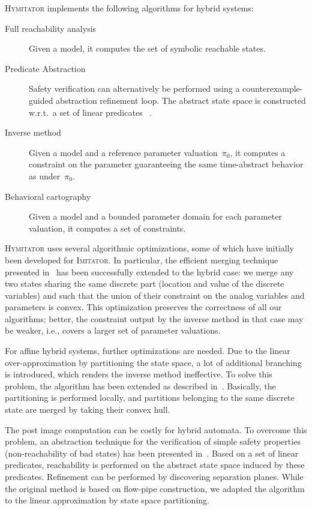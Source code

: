 \documentclass{llncs}
\newcommand{\pio}{\pi_0}
\newcommand{\imitator}{\textsc{Imitator}}
\newcommand{\hymitator}{\textsc{Hymitator}}
\begin{document}
\hymitator{} implements the following algorithms for hybrid systems:
\begin{description}
	\item[Full reachability analysis] Given a model, it computes the set of symbolic reachable states.
\item[Predicate Abstraction] Safety verification can alternatively be performed using a counterexample-guided abstraction refinement loop. The abstract state space is constructed w.r.t.~a set of linear predicates%
	~\cite{ADI2006}.
	\item[Inverse method] Given a model and a reference parameter valuation~$\pio$, it computes a constraint on the parameter guaranteeing the same time-abstract behavior as under~$\pio$.
	\item[Behavioral cartography] Given a model and a bounded parameter domain for each parameter valuation, it computes a set of constraints.%
\end{description}

\hymitator{} uses several algorithmic optimizations, some of which have initially been developed for \imitator{}.
In particular, the efficient merging technique presented in~\cite{AFS12} has been successfully extended to the hybrid case: we merge any two states sharing the same discrete part (location and value of the discrete variables) and such that the union of their constraint on the analog variables and parameters is convex.
This optimization preserves the correctness of all our algorithms; better, the constraint output by the inverse method in that case may be weaker, i.e., covers a larger set of parameter valuations.

For affine hybrid systems, further optimizations are needed. Due to the linear over-approximation by partitioning the state space, a lot of additional branching is introduced, which renders the inverse method ineffective. To solve this problem, the algorithm has been extended as described in~\cite{FK11}. Basically, the partitioning is performed locally, and partitions belonging to the same discrete state are merged by taking their convex hull. 

The post image computation can be costly for hybrid automata. To overcome this problem, an abstraction technique for the verification of simple safety  properties (non-reachability of bad states) has been presented in~\cite{ADI2006}. Based on a set of linear predicates, reachability is performed on the abstract state space induced by these predicates. Refinement can be performed by discovering separation planes. While the original method is based on flow-pipe construction, we adapted the algorithm to the linear approximation by state space partitioning. 
\end{document}
